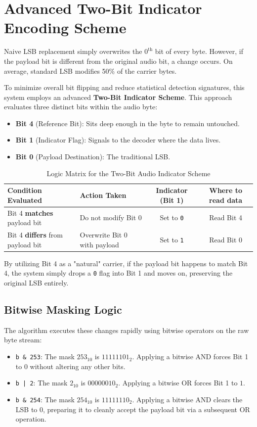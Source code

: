 \documentclass[12pt,a4paper]{report}
\begin{document}
\section{Advanced Two-Bit Indicator Encoding Scheme}
Naive LSB replacement simply overwrites the $0^{\text{th}}$ bit of every byte. However, if the payload bit is different from the original audio bit, a change occurs. On average, standard LSB modifies 50\% of the carrier bytes. 

To minimize overall bit flipping and reduce statistical detection signatures, this system employs an advanced \textbf{Two-Bit Indicator Scheme}. This approach evaluates three distinct bits within the audio byte:
\begin{itemize}
    \item \textbf{Bit 4} (Reference Bit): Sits deep enough in the byte to remain untouched.
    \item \textbf{Bit 1} (Indicator Flag): Signals to the decoder where the data lives.
    \item \textbf{Bit 0} (Payload Destination): The traditional LSB.
\end{itemize}

\begin{table}[H]
\centering
\caption{Logic Matrix for the Two-Bit Audio Indicator Scheme}
\label{tab:audio_logic}
\begin{tabular}{@{}llcc@{}}
\toprule
\textbf{Condition Evaluated} & \textbf{Action Taken} & \textbf{Indicator (Bit 1)} & \textbf{Where to read data} \\
\midrule
Bit 4 \textbf{matches} payload bit & Do not modify Bit 0 & Set to \texttt{0} & Read Bit 4 \\
Bit 4 \textbf{differs} from payload bit & Overwrite Bit 0 with payload & Set to \texttt{1} & Read Bit 0 \\
\bottomrule
\end{tabular}
\end{table}

By utilizing Bit 4 as a "natural" carrier, if the payload bit happens to match Bit 4, the system simply drops a \texttt{0} flag into Bit 1 and moves on, preserving the original LSB entirely. 

\subsection{Bitwise Masking Logic}
The algorithm executes these changes rapidly using bitwise operators on the raw byte stream:
\begin{itemize}
    \item \texttt{b \& 253}: The mask $253_{10}$ is $11111101_2$. Applying a bitwise AND forces Bit 1 to $0$ without altering any other bits.
    \item \texttt{b | 2}: The mask $2_{10}$ is $00000010_2$. Applying a bitwise OR forces Bit 1 to $1$.
    \item \texttt{b \& 254}: The mask $254_{10}$ is $11111110_2$. Applying a bitwise AND clears the LSB to $0$, preparing it to cleanly accept the payload bit via a subsequent OR operation.
\end{itemize}
\end{document}
